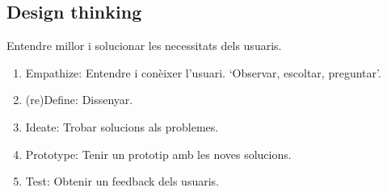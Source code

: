 \subsection{Design thinking}
Entendre millor i solucionar les necessitats dels usuaris.
\begin{enumerate}
    \item Empathize: Entendre i conèixer l'usuari. `Observar, escoltar, preguntar'.
    \item (re)Define: Dissenyar.
    \item Ideate: Trobar solucions als problemes.
    \item Prototype: Tenir un prototip amb les noves solucions.
    \item Test: Obtenir un feedback dels usuaris.
\end{enumerate}
